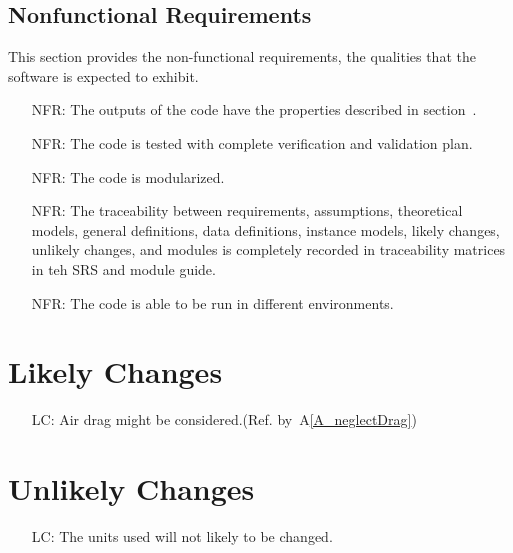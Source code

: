 \documentclass[12pt]{article}
\newcommand{\aref}[1]{A\ref{#1}}
\newcounter{reqnum} %
\newcounter{lcnum} %
\begin{document}
\subsection{Nonfunctional Requirements}\label{sec_nfr}
This section provides the non-functional requirements, the qualities that the software is expected to exhibit.


\noindent \begin{itemize}

\item[NFR\refstepcounter{reqnum}\thereqnum \label{NFR_Correct}:] 
The outputs of the code have the properties described in section~.
\item[NFR\refstepcounter{reqnum}\thereqnum \label{NFR_Verifiable}:]  
The code is tested with complete verification and validation plan.
\item[NFR\refstepcounter{reqnum}\thereqnum \label{R_Reusable}:]
The code is modularized. 
\item[NFR\refstepcounter{reqnum}\thereqnum \label{R_Maintainable}:]
The traceability between requirements, assumptions, theoretical models, general definitions, data definitions, instance models, likely changes, unlikely changes, and modules is completely recorded in traceability matrices in teh SRS and module guide. 
\item[NFR\refstepcounter{reqnum}\thereqnum \label{R_Portable}:]
The code is able to be run in different environments. 
\end{itemize}

\section{Likely Changes}\label{sec_likelyChanges}
\noindent \begin{itemize}

\item[LC\refstepcounter{lcnum}\thelcnum\label{LC_airdrag}:] Air drag might be considered.(Ref. by~\aref{A_neglectDrag})

\end{itemize}

\section{Unlikely Changes}\label{sec_unlikelyChanges}
\noindent \begin{itemize}

\item[LC\refstepcounter{lcnum}\thelcnum\label{LC_units}:] The units used will not likely to be changed.   

\end{itemize}
\end{document}
